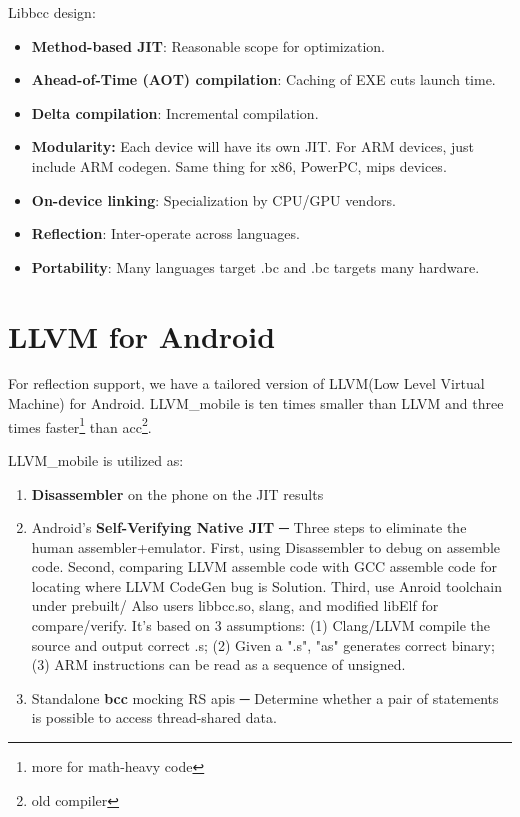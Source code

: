 Libbcc design:
\begin{itemize}
    \item \textbf{Method-based JIT}: Reasonable scope for optimization.
    \item \textbf{Ahead-of-Time (AOT) compilation}: Caching of EXE cuts launch time.
    \item \textbf{Delta compilation}: Incremental compilation.
    \item \textbf{Modularity:} Each device will have its own JIT. For ARM devices, just include ARM codegen. Same thing for x86, PowerPC, mips devices.
    \item \textbf{On-device linking}: Specialization by CPU/GPU vendors.
    \item \textbf{Reflection}: Inter-operate across languages.
    \item \textbf{Portability}: Many languages target .bc and .bc targets many hardware.
\end{itemize}

\section{LLVM for Android}
For reflection support, we have a tailored version of LLVM(Low Level Virtual Machine) for Android. LLVM\_mobile is ten times smaller than LLVM and three times faster\footnote{more for math-heavy code} than acc\footnote{old \RS{} compiler}.  

LLVM\_mobile is utilized as:
\begin{enumerate}
	\item \textbf{Disassembler} on the phone on the JIT results 	
	\item Android's \textbf{Self-Verifying Native JIT} ─ Three steps to eliminate the human assembler+emulator. First, using Disassembler to debug on assemble code. Second, comparing LLVM assemble code with GCC assemble code for locating where LLVM CodeGen bug is Solution. Third, use Anroid toolchain under prebuilt/ Also users libbcc.so, slang, and modified libElf for compare/verify. It's based on 3 assumptions: (1) Clang/LLVM compile the source and output correct .s; (2) Given a ".s", "as" generates correct binary; (3) ARM instructions can be read as a sequence of unsigned. %
 	\item Standalone \textbf{bcc} mocking RS apis ─ Determine whether a pair of statements is possible to access thread-shared data.
\end{enumerate}

